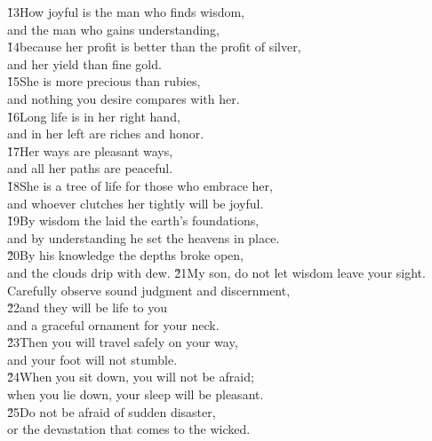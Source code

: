 \begin{poetry}
\poeml \v{13}How joyful is the man who finds wisdom, \\
\poemll    and the man who gains understanding, \\
\poeml \v{14}because her profit is better than the profit of silver, \\
\poemll    and her yield than fine gold. \\
\poeml \v{15}She is more precious than rubies, \\
\poemll    and nothing you desire compares with her. \\
\poeml \v{16}Long life is in her right hand, \\
\poemll    and in her left are riches and honor. \\
\poeml \v{17}Her ways are pleasant ways, \\
\poemll    and all her paths are peaceful. \\
\poeml \v{18}She is a tree of life for those who embrace her, \\
\poemll    and whoever clutches her tightly will be joyful. \\
\poeml \v{19}By wisdom the  laid the earth's foundations, \\
\poemll    and by understanding he set the heavens in place. \\
\poeml \v{20}By his knowledge the depths broke open, \\
\poemll    and the clouds drip with dew.
\poeml \v{21}My son, do not let wisdom leave your sight. \\
\poemll    Carefully observe sound judgment and discernment, \\
\poeml \v{22}and they will be life to you \\
\poemll    and a graceful ornament for your neck. \\
\poeml \v{23}Then you will travel safely on your way, \\
\poemll    and your foot will not stumble. \\
\poeml \v{24}When you sit down, you will not be afraid; \\
\poemll    when you lie down, your sleep will be pleasant. \\
\poeml \v{25}Do not be afraid of sudden disaster, \\
\poemll    or the devastation that comes to the wicked. \\

\end{poetry}
